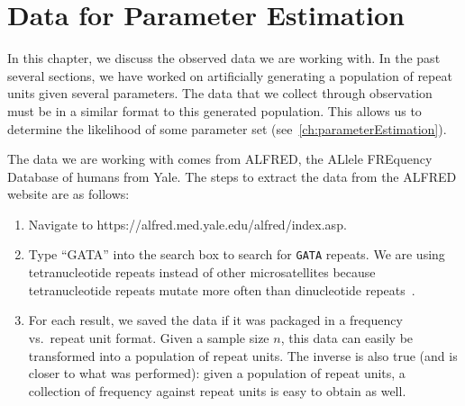 \chapter{Data for Parameter Estimation}\label{ch:dataForParameterEstimation}
In this chapter, we discuss the observed data we are working with.
In the past several sections, we have worked on artificially generating a population of repeat units given several
parameters.
The data that we collect through observation must be in a similar format to this generated population.
This allows us to determine the likelihood of some parameter set (see~\autoref{ch:parameterEstimation}).

The data we are working with comes from ALFRED, the ALlele FREquency Database of humans from Yale.
The steps to extract the data from the ALFRED website are as follows:
\begin{enumerate}
    \item Navigate to https://alfred.med.yale.edu/alfred/index.asp.
    \item Type ``GATA'' into the search box to search for \texttt{GATA} repeats.
        We are using tetranucleotide repeats instead of other microsatellites because tetranucleotide repeats mutate
        more often than dinucleotide repeats~\cite{supleeRelativeStabilitiesDinucleotide1999}.
    \item For each result, we saved the data if it was packaged in a frequency vs.\ repeat unit format.
        Given a sample size $n$, this data can easily be transformed into a population of repeat units.
        The inverse is also true (and is closer to what was performed): given a population of repeat units,
        a collection of frequency against repeat units is easy to obtain as well.
\end{enumerate}
